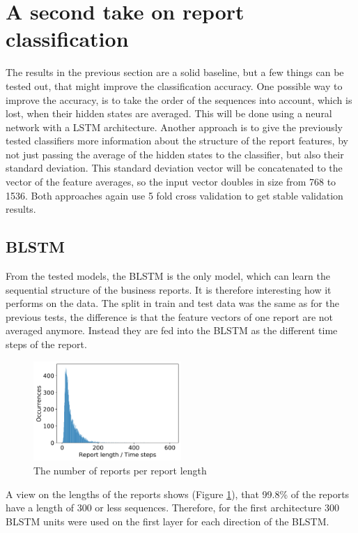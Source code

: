 \section{A second take on report classification}
The results in the previous section are a solid baseline, but a few things can be tested out, that might improve the classification accuracy.
One possible way to improve the accuracy, is to take the order of the sequences into account, which is lost, when their hidden states are averaged.
This will be done using a neural network with a LSTM architecture.
Another approach is to give the previously tested classifiers more information about the structure of the report features, by not just passing the average of the hidden states to the classifier, but also their standard deviation.
This standard deviation vector will be concatenated to the vector of the feature averages, so the input vector doubles in size from 768 to 1536.
Both approaches again use 5 fold cross validation to get stable validation results.

\subsection{\acl{BLSTM}}
From the tested models, the \ac{BLSTM} is the only model, which can learn the sequential structure of the business reports.
It is therefore interesting how it performs on the data.
The split in train and test data was the same as for the previous tests, the difference is that the feature vectors of one report are not averaged anymore.
Instead they are fed into the \ac{BLSTM} as the different time steps of the report.
\begin{figure}[h]
    \centering
    \includegraphics[width=0.5\textwidth]{figures/charts/timesteps_distribution.png}
    \caption{The number of reports per report length}
    \label{figure:timesteps_distribution}
\end{figure}
A view on the lengths of the reports shows (Figure \ref{figure:timesteps_distribution}), that 99.8\% of the reports have a length of 300 or less sequences.
Therefore, for the first architecture 300 \ac{BLSTM} units were used on the first layer for each direction of the \acl{BLSTM}.

